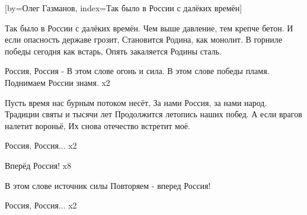 [by={Олег Газманов},
                     index={Так было в России с далёких времён}]
\beginverse

Так было в России с далёких времён.
Чем выше давление, тем крепче бетон.
И если опасность державе грозит,
Становится Родина, как монолит.
В горниле победы сегодня как встарь,
Опять закаляется Родины сталь.

\endverse
\beginverse

Россия, Россия -
В этом слове огонь и сила.
В этом слове победы пламя.
Поднимаем России знамя. x2

\endverse
\beginverse

Пусть время нас бурным потоком несёт,
За нами Россия, за нами народ.
Традиции святы и тысячи лет
Продолжится летопись наших побед.
А если врагов налетит вороньё,
Их снова отечество встретит моё.

\endverse
\beginverse

Россия, Россия... x2

\endverse
\beginverse

Вперёд Россия! x8

\endverse
\beginverse

В этом слове источник силы
Повторяем - вперед Россия!

Россия, Россия... x2

\endverse
\endsong